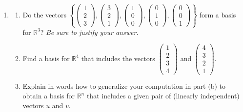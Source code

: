 \begin{enumerate}
\item
\begin{enumerate}\item Do the vectors $\left\{\begin{pmatrix}1\\2\\3\end{pmatrix},\begin{pmatrix}3\\2\\1\end{pmatrix},\begin{pmatrix}1\\0\\0\end{pmatrix},\begin{pmatrix}0\\1\\0\end{pmatrix},\begin{pmatrix}0\\0\\1\end{pmatrix}\right\}$ form a basis for ${\mathbb R}^3$? {\it Be sure to justify your answer.}
\item
Find a basis for ${\mathbb R}^4$ that includes the vectors $\begin{pmatrix}1\\2\\3\\4\end{pmatrix}$
and $\begin{pmatrix}4\\3\\2\\1\end{pmatrix}$.
\item Explain in words how to generalize your computation in part (b) to obtain a basis for ${\mathbb R}^n$ that includes a given pair of (linearly independent) vectors $u$ and $v$. 
\end{enumerate}


\end{enumerate}
